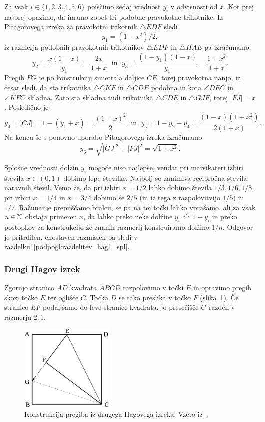 Za vsak $i \in \{1,2,3,4,5,6\}$ poiščimo sedaj vrednost $y_i$ v odvisnosti od $x$. Kot prej najprej opazimo, da imamo zopet tri podobne pravokotne trikotnike. Iz Pitagorovega izreka za pravokotni trikotnik $\triangle EDF$ sledi
$$y_1 = (1-x^2)/2,$$
iz razmerja podobnih pravokotnih trikotnikov $\triangle EDF$ in $\triangle HAE$ pa izračunamo
$$ y_2 = \frac{x(1-x)}{y_1} = \frac{2x}{1+x} \; \text{ in } \; y_3 = \frac{(1-y_1)(1-x)}{y_1} = \frac{1+x^2}{1+x}.$$
Pregib $FG$ je po konstrukciji simetrala daljice $CE$, torej pravokotna nanjo, iz česar sledi, da sta trikotnika $\triangle CKF$ in $\triangle CDE$ podobna in kota $\angle DEC$ in $\angle KFC$ skladna. Zato sta skladna tudi trikotnika $\triangle CDE$ in $\triangle GJF$, torej $|FJ| = x$. Posledično je
$$y_4 = |CJ| = 1 - (y_1 + x) = \frac{(1-x)^2}{2} \; \text{ in } \; y_5 = 1 - y_2 - y_4 = \frac{(1-x)(1+x^2)}{2(1+x)}.$$
Na koncu še s ponovno uporabo Pitagorovega izreka izračunamo
$$ y_6 = \sqrt{|GJ|^2 + |FJ|^2} = \sqrt{1 + x^2}.$$

Splošne vrednosti dolžin $y_i$ mogoče niso najlepše, vendar pri marsikateri izbiri števila $x \in (0,1)$ dobimo lepe številke. Najbolj so zanimiva recipročna števila naravnih števil. Vemo že, da pri izbiri $x = 1/2$ lahko dobimo števila $1/3, 1/6, 1/8$, pri izbiri $x = 1/4$ in $x = 3/4$ dobimo še $2/5$ (in iz tega z razpolovitvijo $1/5$) in $1/7$. Računanje prepuščamo bralcu, se pa na tej točki lahko vprašamo, ali za vsak $n \in \mathbb N$ obstaja primeren $x$, da lahko preko neke dolžine $y_i$ ali $1-y_i$ in preko postopkov za konstrukcijo že znanih razmerij konstruiramo dolžino $1/n$. Odgovor je pritrdilen, enostaven razmislek pa sledi v razdelku~\ref{podpogl:razdelitev_hag1_spl}.

\subsubsection{Drugi Hagov izrek}

\begin{izrek}
    Zgornjo stranico $AD$ kvadrata $ABCD$ razpolovimo v točki $E$ in opravimo pregib skozi točko $E$ ter oglišče $C$. Točka $D$ se tako preslika v točko $F$ (slika~\ref{fig:hagov_izrek2}). Če stranico $EF$ podaljšamo do leve stranice kvadrata, jo presečišče $G$ razdeli v razmerju $2:1$.
\end{izrek}

\begin{figure}[h]
    \centering
    \includegraphics[width=0.4\textwidth]{images/hagovi_izreki/hagov_izrek2.png}
    \caption[Pregib iz drugega Hagovega izreka]{Konstrukcija pregiba iz drugega Hagovega izreka. Vzeto iz~\cite[str. 12]{haga2008}.}
    \label{fig:hagov_izrek2}
\end{figure}

